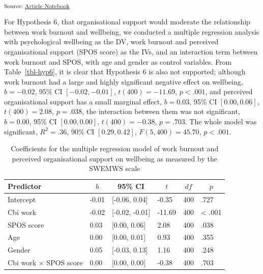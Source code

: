 \documentclass[
  man,
  longtable,
  nolmodern,
  notxfonts,
  notimes,
  colorlinks=true,linkcolor=blue,citecolor=blue,urlcolor=blue]{apa7}
\begin{document}
\textsubscript{Source:
\href{https://deborahapthorp.github.io/Amy_ClimateScientists/index.qmd.html}{Article
Notebook}}

For Hypothesis 6, that organisational support would moderate the
relationship between work burnout and wellbeing, we conducted a multiple
regression analysis with psychological wellbeing as the DV, work burnout
and perceived organisational support (SPOS score) as the IVs, and an
interaction term between work burnout and SPOS, with age and gender as
control variables. From Table~\ref{tbl-hyp6}, it is clear that
Hypothesis 6 is also not supported; although work burnout had a large
and highly significant negative effect on wellbeing, \(b = -0.02\), 95\%
CI \([-0.02, -0.01]\), \(t(400) = -11.69\), \(p < .001\), and perceived
organisational support has a small marginal effect, \(b = 0.03\), 95\%
CI \([0.00, 0.06]\), \(t(400) = 2.08\), \(p = .038\), the interaction
between them was not significant, \(b = 0.00\), 95\% CI
\([0.00, 0.00]\), \(t(400) = -0.38\), \(p = .703\). The whole model was
significant, \(R^2 = .36\), 90\% CI \([0.29, 0.42]\),
\(F(5, 400) = 45.70\), \(p < .001\).

\begin{table}

{\caption{{}{\label{tbl-hyp6}}}
\vspace{-20pt}}

\begin{center}
\begin{threeparttable}

\caption{\label{tab:tbl-hyp6}Coefficients for the multiple regression model of work burnout and perceived organisational support on wellbeing as measured by the SWEMWS scale}

\begin{tabular}{llllll}
\toprule
Predictor & \multicolumn{1}{c}{$b$} & \multicolumn{1}{c}{95\% CI} & \multicolumn{1}{c}{$t$} & \multicolumn{1}{c}{$\mathit{df}$} & \multicolumn{1}{c}{$p$}\\
\midrule
Intercept & -0.01 & {}[-0.06, 0.04] & -0.35 & 400 & .727\\
Cbi work & -0.02 & {}[-0.02, -0.01] & -11.69 & 400 & < .001\\
SPOS score & 0.03 & {}[0.00, 0.06] & 2.08 & 400 & .038\\
Age & 0.00 & {}[0.00, 0.01] & 0.93 & 400 & .355\\
Gender & 0.05 & {}[-0.03, 0.13] & 1.16 & 400 & .248\\
Cbi work $\times$ SPOS score & 0.00 & {}[0.00, 0.00] & -0.38 & 400 & .703\\
\bottomrule
\end{tabular}

\end{threeparttable}
\end{center}

\end{table}
\end{document}
